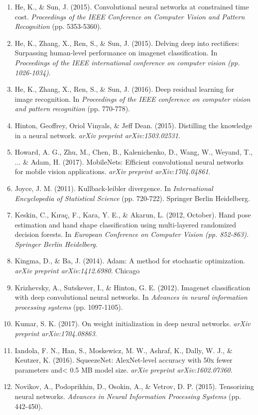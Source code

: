 \documentclass{article}
\begin{document}
\begin{enumerate}
\item He, K., \& Sun, J. (2015). Convolutional neural networks at constrained time cost. \emph{Proceedings of the IEEE Conference on Computer Vision and Pattern Recognition} (pp. 5353-5360).
\item He, K., Zhang, X., Ren, S., \& Sun, J. (2015). Delving deep into rectifiers: Surpassing human-level performance on imagenet classification. In \emph{Proceedings of the IEEE international conference on computer vision (pp. 1026-1034)}.
\item He, K., Zhang, X., Ren, S., \& Sun, J. (2016). Deep residual learning for image recognition. In \emph{Proceedings of the IEEE conference on computer vision and pattern recognition} (pp. 770-778).
\item Hinton, Geoffrey, Oriol Vinyals, \& Jeff Dean.  (2015). Distilling the knowledge in a neural network. \emph{arXiv preprint arXiv:1503.02531}.
\item Howard, A. G., Zhu, M., Chen, B., Kalenichenko, D., Wang, W., Weyand, T., ... \& Adam, H. (2017). MobileNets: Efficient convolutional neural networks for mobile vision applications. \emph{arXiv preprint arXiv:1704.04861}.
\item Joyce, J. M. (2011). Kullback-leibler divergence. In \emph{International Encyclopedia of Statistical Science} (pp. 720-722). Springer Berlin Heidelberg.
\item Keskin, C., Kıraç, F., Kara, Y. E., \& Akarun, L. (2012, October). Hand pose estimation and hand shape classification using multi-layered randomized decision forests. In \emph{European Conference on Computer Vision (pp. 852-863). Springer Berlin Heidelberg}.
\item Kingma, D., \& Ba, J. (2014). Adam: A method for stochastic optimization. \emph{arXiv preprint arXiv:1412.6980}.
Chicago	
\item Krizhevsky, A., Sutskever, I., \& Hinton, G. E. (2012). Imagenet classification with deep convolutional neural networks. In \emph{Advances in neural information processing systems} (pp. 1097-1105).
\item Kumar, S. K. (2017). On weight initialization in deep neural networks. \emph{arXiv preprint arXiv:1704.08863}.
\item Iandola, F. N., Han, S., Moskewicz, M. W., Ashraf, K., Dally, W. J., \& Keutzer, K. (2016). SqueezeNet: AlexNet-level accuracy with 50x fewer parameters and< 0.5 MB model size. \emph{arXiv preprint arXiv:1602.07360}.
\item Novikov, A., Podoprikhin, D., Osokin, A., \& Vetrov, D. P. (2015). Tensorizing neural networks. \emph{Advances in Neural Information Processing Systems} (pp. 442-450).

\end{enumerate}
\end{document}
